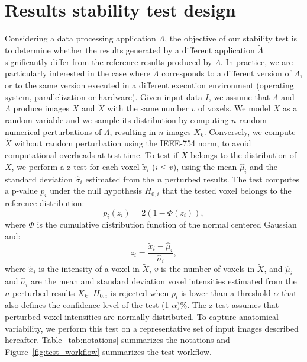 \documentclass[lettersize,journal]{IEEEtran}
\begin{document}
\section{Results stability test design}

Considering a data processing application $\Lambda$, the objective of our stability test is to determine whether the results generated by a different application $\tilde \Lambda$ significantly differ from the reference results produced by $\Lambda$. In practice, we are particularly interested in the case where $\tilde \Lambda$ corresponds to a different version of $\Lambda$, or to the same version executed in a different execution environment (operating system, parallelization or hardware). Given input data $I$, we assume that $\Lambda$ and $\tilde \Lambda$ produce images $X$ and $\tilde X$ with the same number $v$ of voxels. We model $X$ as a random variable and we sample its distribution by computing $n$ random numerical perturbations of $\Lambda$, resulting in $n$ images $X_k$. Conversely, we compute $\tilde X$ without random perturbation using the IEEE-754 norm, to avoid computational overheads at test time. To test if $\tilde X$ belongs to the distribution of $X$, we perform a z-test for each voxel $\tilde x_i$ ($i\leq v$), using the mean $\hat \mu_i$ and the standard deviation $\hat \sigma_i$ estimated from the $n$ perturbed results. The test computes a p-value $p_i$ under the null hypothesis $H_{0,i}$ that the tested voxel belongs to the reference distribution:
\begin{equation} \label{eq:pval}
    p_i(z_i) = 2 \left(1-\Phi(z_i)\right),
\end{equation}
where $\Phi$ is the cumulative distribution function of the normal centered
Gaussian and:
\begin{equation*}
    z_i = \frac{\tilde x_i-\hat \mu_i}{\hat \sigma_i},
\end{equation*}
where $\tilde x_i$ is the intensity of a voxel in $\tilde X$, $v$ is the number of voxels in $\tilde X$, and $\hat \mu_i$ and $\hat \sigma_i$ are the mean and standard deviation voxel intensities estimated from the $n$ perturbed results $X_k$. $H_{0,i}$ is rejected when $p_i$ is lower than a threshold $\alpha$ that also defines the confidence level of the test (1-$\alpha$)\%. The z-test assumes that perturbed voxel intensities are normally distributed. To capture anatomical variability, we perform this test on a representative set of input images described hereafter. Table~\ref{tab:notations} summarizes the notations and Figure~\ref{fig:test_workflow} summarizes the test workflow.
\end{document}
